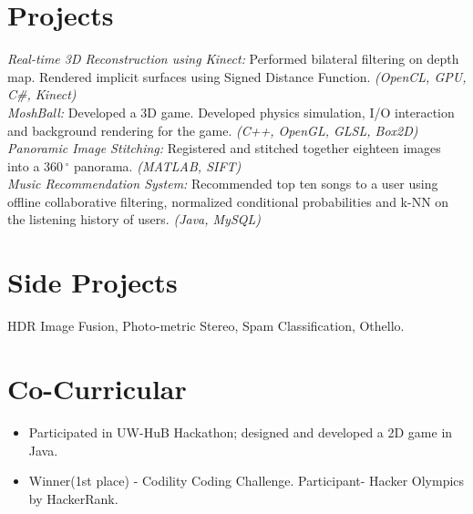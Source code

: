 \documentclass[margin]{res}
\begin{document}
\begin{resume}
\section{Projects}
{\it Real-time 3D Reconstruction using Kinect:} Performed bilateral filtering on depth map. Rendered implicit surfaces using Signed Distance Function. {\it(OpenCL, GPU, C\#, Kinect)}
\\{\it MoshBall:} Developed a 3D game. Developed physics simulation, I/O interaction and background rendering for the game. {\it (C++, OpenGL, GLSL, Box2D)}  
\\{\it Panoramic Image Stitching:} Registered and stitched together eighteen images into a $360\,^{\circ}$ panorama. {\it (MATLAB, SIFT)}
\\{\it Music Recommendation System:} Recommended top ten songs to a user using offline collaborative filtering, normalized conditional probabilities and k-NN on the listening history of users. {\it (Java, MySQL)}

\section{Side Projects}
HDR Image Fusion, Photo-metric Stereo, Spam Classification, Othello.
\section{Co-Curricular}
\begin{itemize} \itemsep -2pt  %
 \item Participated in UW-HuB Hackathon; designed and developed a 2D game in Java.
 \item Winner(1st place) - Codility Coding Challenge. Participant- Hacker Olympics by HackerRank.
 \end{itemize}



\end{resume} 
\end{document}
